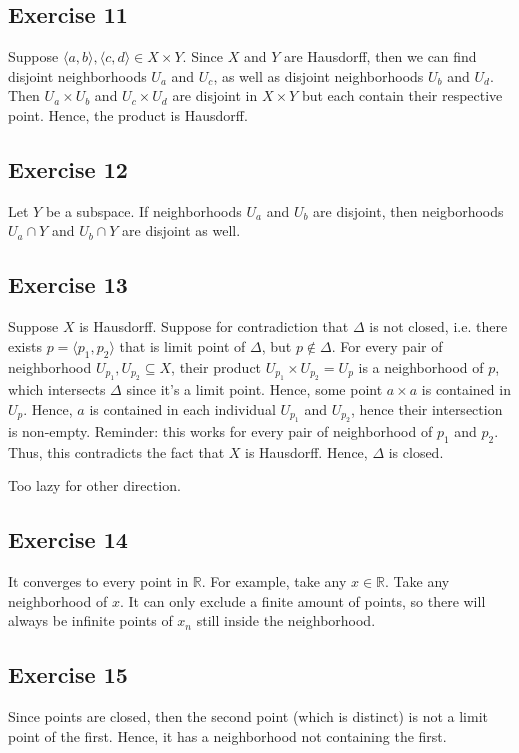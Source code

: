 \documentclass{book}
\begin{document}
\subsection*{Exercise 11}
Suppose $\langle a, b \rangle, \langle c, d \rangle \in X \times Y$. Since $X$ and $Y$ are Hausdorff, then we can find disjoint neighborhoods $U_a$ and $U_c$, as well as disjoint neighborhoods $U_b$ and $U_d$. Then $U_a \times U_b$ and $U_c \times U_d$ are disjoint in $X \times Y$ but each contain their respective point. Hence, the product is Hausdorff.

\subsection*{Exercise 12}
Let $Y$ be a subspace. If neighborhoods $U_a$ and $U_b$ are disjoint, then neigborhoods $U_a \cap Y$ and $U_b \cap Y$ are disjoint as well.

\subsection*{Exercise 13}
Suppose $X$ is Hausdorff. Suppose for contradiction that $\Delta$ is not closed, i.e. there exists $p = \langle p_1, p_2 \rangle$ that is limit point of $\Delta$, but $p \not \in \Delta$. For every pair of neighborhood $U_{p_1}, U_{p_2} \subseteq X$, their product $U_{p_1} \times U_{p_2} = U_p$ is a neighborhood of $p$, which intersects $\Delta$ since it's a limit point. Hence, some point $a \times a$ is contained in $U_p$. Hence, $a$ is contained in each individual $U_{p_1}$ and $U_{p_2}$, hence their intersection is non-empty. Reminder: this works for every pair of neighborhood of $p_1$ and $p_2$. Thus, this contradicts the fact that $X$ is Hausdorff. Hence, $\Delta$ is closed.

Too lazy for other direction.

\subsection*{Exercise 14}
It converges to every point in $\mathbb{R}$. For example, take any $x \in \mathbb{R}$. Take any neighborhood of $x$. It can only exclude a finite amount of points, so there will always be infinite points of $x_n$ still inside the neighborhood.

\subsection*{Exercise 15}
Since points are closed, then the second point (which is distinct) is not a limit point of the first. Hence, it has a neighborhood not containing the first.
\end{document}
